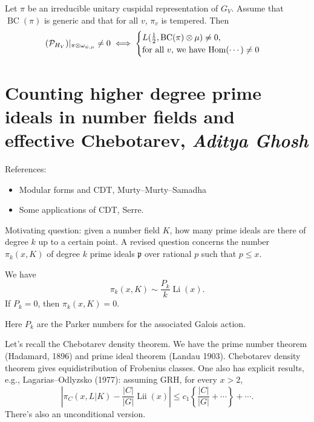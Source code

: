 \documentclass[reqno]{amsart} 
\begin{document}
\begin{corollary}
  Let $\pi$ be an irreducible unitary cuspidal representation of $G_{V}$.  Assume that $\operatorname{BC}(\pi)$ is generic and that for all $v$, $\pi_v$ is tempered.  Then
  \begin{equation*}
    (\mathcal{P}_{H_V}) |_{\pi \otimes \omega_{\psi, \mu}} \neq 0
    \iff
    \begin{cases}
      L(\tfrac{1}{2}, \operatorname{BC}(\pi) \otimes \mu) \neq 0,      &  \\
      \text{for all $v$, we have $\operatorname{Hom} (\dotsb) \neq 0$}                                                                       &
    \end{cases}
  \end{equation*}
\end{corollary}

\section{Counting higher degree prime ideals in number fields and effective Chebotarev, \textnormal{\emph{Aditya Ghosh}}}
References:
\begin{itemize}
\item Modular forms and CDT, Murty--Murty--Samadha
\item Some applications of CDT, Serre.
\end{itemize}

Motivating question: given a number field $K$, how many prime ideals are there of degree $k$ up to a certain point.  A revised question concerns the number $\pi_k(x, K)$ of degree $k$ prime ideals $\mathfrak{p}$ over rational $p$ such that $p \leq x$.

\begin{theorem}[Breuillard--G, 2023]
  We have
  \begin{equation*}
    \pi_k(x, K) \sim \frac{P_k}{k} \operatorname{Li}(x).
  \end{equation*}
  If $P_k = 0$, then $\pi_k(x, K) = 0$.
\end{theorem}
Here $P_k$ are the Parker numbers for the associated Galois action.

Let's recall the Chebotarev density theorem.  We have the prime number theorem (Hadamard, 1896) and prime ideal theorem (Landau 1903).  Chebotarev density theorem gives equidistribution of Frobenius classes.  One also has explicit results, e.g., Lagarias--Odlyzsko (1977): assuming GRH, for every $x > 2$,
\begin{equation*}
  \left| \pi_{C}(x, L|K)
    - \frac{\lvert C \rvert}{ \lvert G \rvert} \operatorname{Lii}(x)
  \right|
  \leq
  c_1
  \left\{ \frac{\lvert C \rvert}{\lvert G \rvert}  + \dotsb \right\} + \dotsb.
\end{equation*}
There's also an unconditional version.
\end{document}
